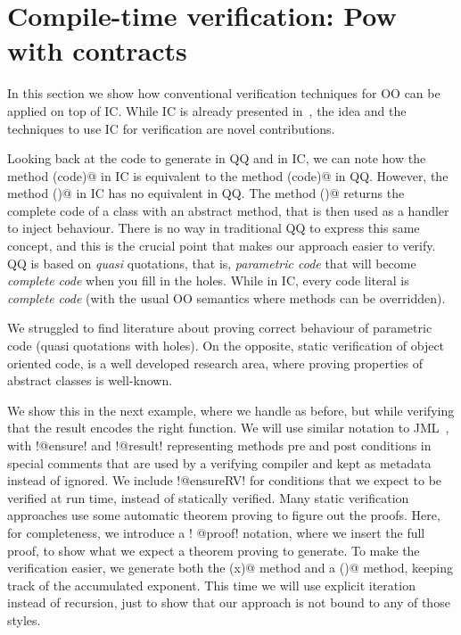 \section{Compile-time verification: Pow with contracts}
\label{s:verification}
In this section we show how conventional verification techniques for OO can be applied on top of IC.
While IC is already presented in~\cite{servetto2014meta},
the idea and the techniques to use IC for verification are novel contributions.

Looking back at the code to generate \Q@pow@ in QQ and in IC,
we can
note how the method \Q@inductive(code)@ in IC is equivalent to the method
\Q@inductive(code)@ in QQ.
However,
the method \Q@inductive()@ in IC has no equivalent in QQ. The method
\Q@inductive()@ returns the complete code of a class with an abstract method,
that is then used as a handler to inject behaviour.
There is no way in traditional QQ to express this same concept,
and this is the crucial point that makes our approach easier to verify.
QQ is based on \emph{quasi} quotations, that is, \emph{parametric code} that
will become \emph{complete code} when you fill in the holes.
While in IC, every code literal is \emph{complete code} (with
the usual OO semantics where methods can be overridden).

We struggled to find literature about proving correct behaviour of parametric code (quasi quotations with holes). On the opposite, static verification of object oriented code,
is a well developed research area, where proving properties
of abstract classes is well-known.

We show this in the next example, where we handle \Q@pow@ as before, but while verifying that the
result encodes the right \Q@pow@ function. We will use similar notation to JML~\cite{jml}, with \Q!@ensure! and \Q!@result! representing methods pre and post conditions in special comments that are used by a verifying compiler and kept as metadata instead of ignored.
We include \Q!@ensureRV! for conditions that we expect to be verified at run time, instead of statically verified.
Many static verification approaches use some automatic theorem proving to figure out the proofs. Here, for completeness, we introduce a 
\Q! @proof! notation, where we insert the full proof, to show what we expect a theorem proving to generate.
To make the verification easier, we generate both the \Q@pow(x)@ method
and a \Q@exp()@ method, keeping track of the accumulated exponent.
This time we will use explicit iteration instead of recursion, just to show that our approach is not bound to any of those styles.
\newcommand\thisExp{\ensuremath{{}^{\textbf{this.exp()}}}}
\newcommand\thisSuperExp{\ensuremath{{}^{\textbf{this.superExp()}}}}
\newcommand\oneThisSuperExp{\ensuremath{{}^{\textbf{1+this.superExp()}}}}
\newcommand\powerY{\ensuremath{{}^{\textbf{y}}}}

